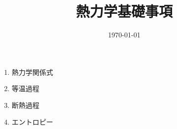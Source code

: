 \documentclass[11pt,a4paper]{jarticle}
\title{熱力学基礎事項}
\author{}
\date{\today}
\begin{document}
\maketitle
\begin{enumerate}
    \item 熱力学関係式
    \item 等温過程
    \item 断熱過程
    \item エントロピー
\end{enumerate}
\end{document}
